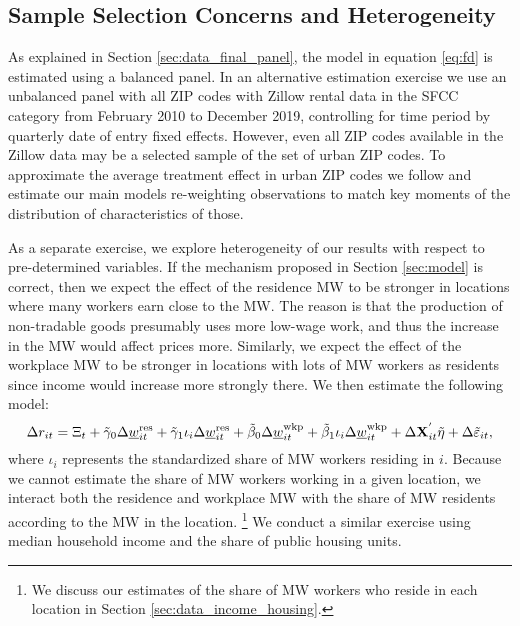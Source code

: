 \subsection{Sample Selection Concerns and Heterogeneity}\label{sec:emp_start_heterogeneity}

As explained in Section \ref{sec:data_final_panel}, 
the model in equation \eqref{eq:fd} is estimated using a balanced panel.
In an alternative estimation exercise we use an unbalanced panel with all 
ZIP codes with Zillow rental data in the SFCC category 
from February 2010 to December 2019, controlling for time period by 
quarterly date of entry fixed effects.
However, even all ZIP codes available in the Zillow data may be 
a selected sample of the set of urban ZIP codes.
To approximate the average treatment effect in urban ZIP codes we follow
\textcite{Hainmueller2012} and estimate our main models re-weighting 
observations to match key moments of the distribution of characteristics of 
those.

As a separate exercise, we explore heterogeneity of our results with respect
to pre-determined variables.
If the mechanism proposed in Section \ref{sec:model} is correct, then we
expect the effect of the residence MW to be stronger in locations where many 
workers earn close to the MW.
The reason is that the production of non-tradable goods presumably uses more
low-wage work, and thus the increase in the MW would affect prices more.
Similarly, we expect the effect of the workplace MW to be stronger in locations
with lots of MW workers as residents since income would increase more 
strongly there.
We then estimate the following model:
\begin{equation*}\label{eq:fd_heterogeneity}
    \Delta r_{it} = \Xi_t
                  + \tilde\gamma_0 \Delta \underline{w}^{\text{res}}_{it}
                  + \tilde\gamma_1 \iota_i \Delta \underline{w}^{\text{res}}_{it}
                  + \tilde\beta_0 \Delta \underline{w}^{\text{wkp}}_{it}
                  + \tilde\beta_1 \iota_i \Delta \underline{w}^{\text{wkp}}_{it}
                  + \Delta \mathbf{X}^{'}_{it}\tilde\eta
                  + \Delta \tilde\varepsilon_{it} ,
\end{equation*}
where $\iota_i$ represents the standardized share of MW workers residing in $i$.
Because we cannot estimate the share of MW workers working in a given location,
we interact both the residence and workplace MW with the share of MW residents
according to the MW in the location.%
\footnote{We discuss our estimates of the share of MW workers who reside in each 
location in Section \ref{sec:data_income_housing}.}
We conduct a similar exercise using median household income and the share of 
public housing units.
